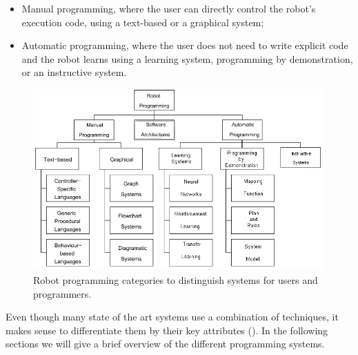\begin{itemize}
  \item Manual programming, where the user can directly control the robot's execution code, using a text-based or a graphical system;
  \item Automatic programming, where the user does not need to write explicit code and the robot learns using a learning system, programming by demonstration, or an instructive system.
\end{itemize}

 \begin{figure}[ht]
 \centering
\includegraphics[width=\linewidth]{figures/Biggs2003-RobotProgramming}
 \caption{Robot programming categories to distinguish systems for users and programmers. \cite{Biggs2003}}
 \label{fig:RobotProgrammingSystems}
\end{figure} 

Even though many state of the art systems use a combination of techniques, it makes sense to differentiate them by their key attributes ().
In the following sections we will give a brief overview of the different programming systems.

